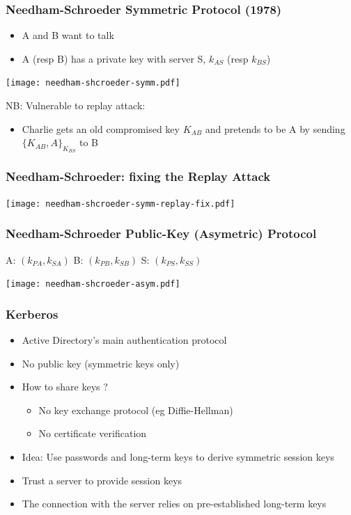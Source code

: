 \documentclass[
hyperref={pdfpagelabels=false}
,xcolor=table
]
{beamer}
\begin{document}
\begin{frame}
  \frametitle{Needham-Schroeder Symmetric Protocol (1978)}

  \begin{itemize}
  \item A and B want to talk
  \item A (resp B) has a private key with server S, $k_{AS}$ (resp $k_{BS}$)
  \end{itemize}

  
  \begin{center}
    \texttt{[image: needham-shcroeder-symm.pdf]}
  \end{center}

  NB: Vulnerable to replay attack: 
  \begin{itemize}
  \item Charlie gets an old compromised key $K_{AB}$ and pretends to be A by sending $\{K_{AB}, A\}_{K_{BS}}$ to B
  \end{itemize}
\end{frame}



\begin{frame}
  \frametitle{Needham-Schroeder: fixing the Replay Attack}

  \begin{center}
    \texttt{[image: needham-shcroeder-symm-replay-fix.pdf]}
  \end{center}
\end{frame}



\begin{frame}
  \frametitle{Needham-Schroeder Public-Key (Asymetric) Protocol}

  A: $(k_{PA}, k_{SA})$    B: $(k_{PB}, k_{SB})$      S: $(k_{PS}, k_{SS})$  


  \begin{center}
    \texttt{[image: needham-shcroeder-asym.pdf]}
  \end{center}  
  
\end{frame}



\begin{frame}
  \frametitle{Kerberos}
  \begin{itemize}
  \item Active Directory's main authentication protocol
  \item No public key (symmetric keys only)
  \item How to share keys ?
    \begin{itemize}
    \item No key exchange protocol (eg Diffie-Hellman)
    \item No certificate verification
    \end{itemize}
  \item Idea: Use passwords and long-term keys to derive symmetric session keys
  \item Trust a server to provide session keys
  \item The connection with the server relies on pre-established long-term keys
  \end{itemize}
\end{frame}
\end{document}
